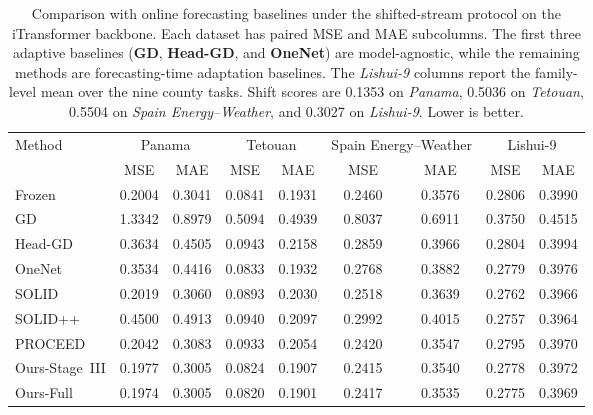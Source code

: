 ﻿\documentclass[journal]{IEEEtran}
\begin{document}
\begin{table}[t]
\caption{Comparison with online forecasting baselines under the shifted-stream protocol on the iTransformer backbone. Each dataset has paired MSE and MAE subcolumns. The first three adaptive baselines (\textbf{GD}, \textbf{Head-GD}, and \textbf{OneNet}) are model-agnostic, while the remaining methods are forecasting-time adaptation baselines. The \textit{Lishui-9} columns report the family-level mean over the nine county tasks. Shift scores are 0.1353 on \textit{Panama}, 0.5036 on \textit{Tetouan}, 0.5504 on \textit{Spain Energy--Weather}, and 0.3027 on \textit{Lishui-9}. Lower is better.}
\label{tab:shifted_online_sota}
\centering
\footnotesize
\setlength{\tabcolsep}{3.5pt}
\begin{tabular}{lcccccccc}
\toprule
Method & \multicolumn{2}{c}{Panama} & \multicolumn{2}{c}{Tetouan} & \multicolumn{2}{c}{Spain Energy--Weather} & \multicolumn{2}{c}{Lishui-9} \\
\cmidrule(lr){2-3}\cmidrule(lr){4-5}\cmidrule(lr){6-7}\cmidrule(lr){8-9}
 & MSE & MAE & MSE & MAE & MSE & MAE & MSE & MAE \\
\midrule
Frozen & 0.2004 & 0.3041 & 0.0841 & 0.1931 & 0.2460 & 0.3576 & 0.2806 & 0.3990 \\
GD & 1.3342 & 0.8979 & 0.5094 & 0.4939 & 0.8037 & 0.6911 & 0.3750 & 0.4515 \\
Head-GD & 0.3634 & 0.4505 & 0.0943 & 0.2158 & 0.2859 & 0.3966 & 0.2804 & 0.3994 \\
OneNet & 0.3534 & 0.4416 & 0.0833 & 0.1932 & 0.2768 & 0.3882 & 0.2779 & 0.3976 \\
SOLID & 0.2019 & 0.3060 & 0.0893 & 0.2030 & 0.2518 & 0.3639 & 0.2762 & 0.3966 \\
SOLID++ & 0.4500 & 0.4913 & 0.0940 & 0.2097 & 0.2992 & 0.4015 & 0.2757 & 0.3964 \\
PROCEED & 0.2042 & 0.3083 & 0.0933 & 0.2054 & 0.2420 & 0.3547 & 0.2795 & 0.3970 \\
Ours-Stage~III & 0.1977 & 0.3005 & 0.0824 & 0.1907 & 0.2415 & 0.3540 & 0.2778 & 0.3972 \\
Ours-Full & 0.1974 & 0.3005 & 0.0820 & 0.1901 & 0.2417 & 0.3535 & 0.2775 & 0.3969 \\
\bottomrule
\end{tabular}
\end{table}
\end{document}
